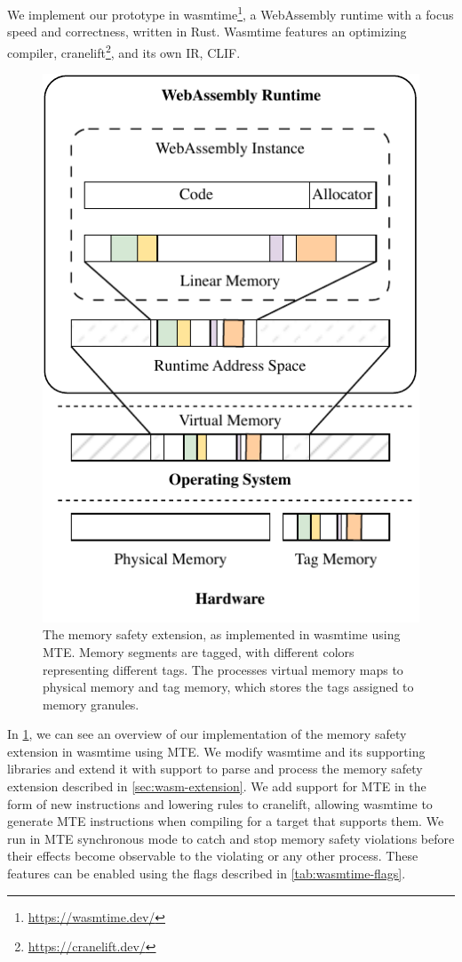 We implement our prototype in wasmtime\footnote{\url{https://wasmtime.dev/}}, a WebAssembly runtime with a focus speed and correctness, written in Rust.
Wasmtime features an optimizing compiler, cranelift\footnote{\url{https://cranelift.dev/}}, and its own \ac{IR}, \ac{CLIF}.

\begin{figure}[t]
  \centering
  \includegraphics[scale=1]{figures/build/system-design-2}
  \caption{The memory safety extension, as implemented in wasmtime using \ac{MTE}. Memory segments are tagged, with different colors representing different tags. The processes virtual memory maps to physical memory and tag memory, which stores the tags assigned to memory granules.}
  \label{fig:wasmtime-mte-impl}
\end{figure}

In \cref{fig:wasmtime-mte-impl}, we can see an overview of our implementation of the memory safety extension in wasmtime using \ac{MTE}.
We modify wasmtime and its supporting libraries and extend it with support to parse and process the memory safety extension described in \cref{sec:wasm-extension}.
We add support for \ac{MTE} in the form of new instructions and lowering rules to cranelift, allowing wasmtime to generate \ac{MTE} instructions when compiling for a target that supports them.
We run in \ac{MTE} synchronous mode to catch and stop memory safety violations before their effects become observable to the violating or any other process.
These features can be enabled using the flags described in \cref{tab:wasmtime-flags}.

